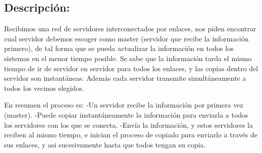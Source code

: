 \subsection{Descripción:}

Recibimos una red de servidores interconectados por enlaces, nos piden encontrar cual servidor debemos escoger como master (servidor que recibe la información primero), de tal forma que se pueda actualizar la información en todos los sistemas en el menor tiempo posible.
Se sabe que la información tarda el mismo tiempo de ir de servidor en servidor para todos los enlaces, y las copias dentro del servidor son instantáneas.
Además cada servidor transmite simultáneamente a todos los vecinos elegidos.

En resumen el proceso es:
-Un servidor recibe la información por primera vez (master).
-Puede copiar instantáneamente la información para enviarla a todos los servidores con los que se conecta.
-Envía la información, y estos servidores la reciben al mismo tiempo, e inician el proceso de copiado para enviarlo a través de sus enlaces, y asi sucesivamente hasta que todos tengan su copia.

